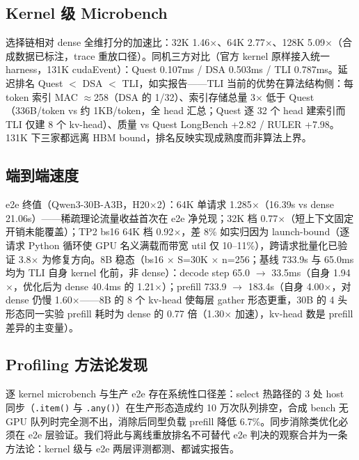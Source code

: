 \documentclass[11pt]{article}
\begin{document}
\subsection{Kernel 级 Microbench}

选择链相对 dense 全维打分的加速比：32K 1.46$\times$、64K 2.77$\times$、128K 5.09$\times$（合成数据已标注，trace 重放口径）。同机三方对比（官方 kernel 原样接入统一 harness，131K cudaEvent）：Quest 0.107ms / DSA 0.503ms / TLI 0.787ms。延迟排名 Quest $<$ DSA $<$ TLI，如实报告——TLI 当前的优势在算法结构侧：每 token 索引 MAC $\approx$258（DSA 的 1/32）、索引存储总量 3$\times$ 低于 Quest（336B/token vs 约 1KB/token，全 head 汇总；Quest 逐 32 个 head 建索引而 TLI 仅建 8 个 kv-head）、质量 vs Quest LongBench +2.82 / RULER +7.98。131K 下三家都远离 HBM bound，排名反映实现成熟度而非算法上界。

\subsection{端到端速度}

e2e 终值（Qwen3-30B-A3B，H20$\times$2）：64K 单请求 1.285$\times$（16.39s vs dense 21.06s）——稀疏理论流量收益首次在 e2e 净兑现；32K 档 0.77$\times$（短上下文固定开销未能覆盖）；TP2 bs16 64K 档 0.92$\times$，差 8\% 如实归因为 launch-bound（逐请求 Python 循环使 GPU 名义满载而带宽 util 仅 10--11\%），跨请求批量化已验证 3.8$\times$ 为修复方向。8B 稳态（bs16 $\times$ S=30K $\times$ n=256；基线 733.9s 与 65.0ms 均为 TLI 自身 kernel 化前，非 dense）：decode step 65.0 $\rightarrow$ 33.5ms（自身 1.94$\times$，优化后为 dense 40.4ms 的 1.21$\times$）；prefill 733.9 $\rightarrow$ 183.4s（自身 4.00$\times$，对 dense 仍慢 1.60$\times$——8B 的 8 个 kv-head 使每层 gather 形态更重，30B 的 4 头形态同一实验 prefill 耗时为 dense 的 0.77 倍（1.30$\times$ 加速），kv-head 数是 prefill 差异的主变量）。

\subsection{Profiling 方法论发现}

逐 kernel microbench 与生产 e2e 存在系统性口径差：select 热路径的 3 处 host 同步（\texttt{.item()} 与 \texttt{.any()}）在生产形态造成约 10 万次队列排空，合成 bench 无 GPU 队列时完全测不出，消除后同型负载 prefill 降低 6.7\%。同步消除类优化必须在 e2e 层验证。我们将此与离线重放排名不可替代 e2e 判决的观察合并为一条方法论：kernel 级与 e2e 两层评测都测、都诚实报告。

\end{document}
